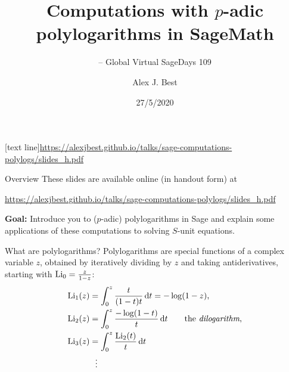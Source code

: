 \author{Alex J. Best}
\date{27/5/2020}
\title{Computations with $p$-adic polylogarithms in SageMath}
\subtitle{-- Global Virtual SageDays 109}
[text line]{\url{https://alexjbest.github.io/talks/sage-computations-polylogs/slides_h.pdf}}



\begin{frame}
    \titlepage


\end{frame}


\begin{frame}{Overview}
    These slides are available online (in handout form) at

    {\url{https://alexjbest.github.io/talks/sage-computations-polylogs/slides_h.pdf}}

    \pause

    \textbf{Goal:}  Introduce you to ($p$-adic) polylogarithms in Sage and explain some applications of these computations to solving $S$-unit equations.

\end{frame}

\begin{frame}{What are polylogarithms?}
    Polylogarithms are special functions of a complex variable $z$, obtained by iteratively dividing by $z$ and taking antiderivatives, starting with $\operatorname{Li}_0 = \frac{z}{1-z}$:
    \begin{align*}
        \operatorname{Li}_1 (z) &= \int_0^z \frac{t}{(1-t)t} \mathop{}\!\mathrm{d} t= - \log(1-z)\text,\\
        \operatorname{Li}_2 (z) &= \int_0^z \frac{-\log(1-t)}t \mathop{}\!\mathrm{d} t \qquad \text{the \emph{dilogarithm},}\\
        \operatorname{Li}_3 (z) &= \int_0^z \frac{\operatorname{Li}_2(t)}t \mathop{}\!\mathrm{d} t\\
        &\ \ \vdots
    \end{align*}
\end{frame}

